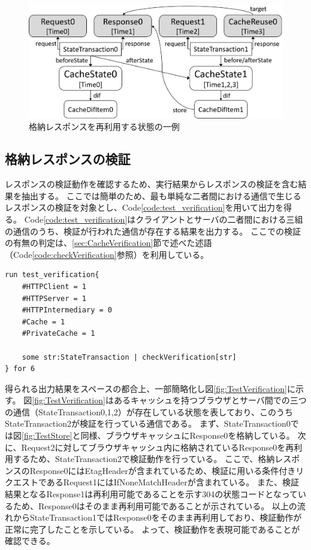 \documentclass[12pt,a4paper]{jbook}
\begin{document}
\begin{figure}[htb]
\centering
\includegraphics[width=450pt]{./fig/TestReuse.eps}
\caption{格納レスポンスを再利用する状態の一例}
\label{fig:TestReuse}
\end{figure}

\subsection{格納レスポンスの検証}
レスポンスの検証動作を確認するため、実行結果からレスポンスの検証を含む結果を抽出する。
ここでは簡単のため、最も単純な二者間における通信で生じるレスポンスの検証を対象とし、Code\ref{code:test_verification}を用いて出力を得る。
Code\ref{code:test_verification}はクライアントとサーバの二者間における三組の通信のうち、検証が行われた通信が存在する結果を出力する。
ここでの検証の有無の判定は、\ref{sec:CacheVerification}節で述べた述語（Code\ref{code:checkVerification}参照）を利用している。

\begin{lstlisting}[caption=格納レスポンスの検証, label=code:test_verification]
run test_verification{
	#HTTPClient = 1
	#HTTPServer = 1
	#HTTPIntermediary = 0
	#Cache = 1
	#PrivateCache = 1

	some str:StateTransaction | checkVerification[str]
} for 6
\end{lstlisting}

得られる出力結果をスペースの都合上、一部簡略化し図\ref{fig:TestVerification}に示す。
図\ref{fig:TestVerification}はあるキャッシュを持つブラウザとサーバ間での三つの通信（StateTransaction0,1,2）が存在している状態を表しており、このうちStateTransaction2が検証を行っている通信である。
まず、StateTransaction0では図\ref{fig:TestStore}と同様、ブラウザキャッシュにResponse0を格納している。
次に、Request2に対してブラウザキャッシュ内に格納されているResponse0を再利用するため、StateTransaction2で検証動作を行っている。
ここで、格納レスポンスのResponse0にはEtagHeaderが含まれているため、検証に用いる条件付きリクエストであるRequest1にはIfNoneMatchHeaderが含まれている。
また、検証結果となるResponse1は再利用可能であることを示す304の状態コードとなっているため、Response0はそのまま再利用可能であることが示されている。
以上の流れからStateTransaction1ではResponse0をそのまま再利用しており、検証動作が正常に完了したことを示している。
よって、検証動作を表現可能であることが確認できる。
\end{document}
